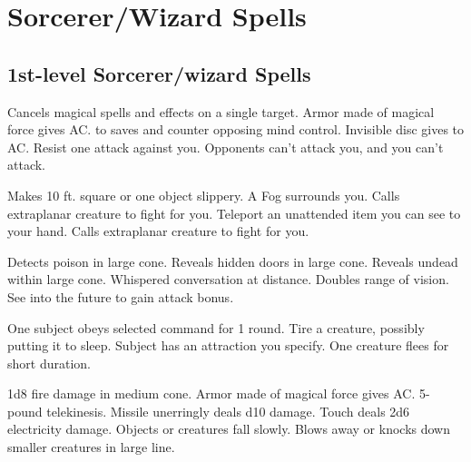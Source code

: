 \section{Sorcerer/Wizard Spells}
\subsection{1st-level Sorcerer/wizard Spells}
\begin{swspelllist}
 Cancels magical spells and effects on a single target.
 Armor made of magical force gives  AC.
  to saves and counter opposing mind control.
 Invisible disc gives  to AC.
 Resist one attack against you.
 Opponents can't attack you, and you can't attack.

 Makes 10 ft. square or one object slippery.
 A Fog surrounds you.
 Calls extraplanar creature to fight for you.
 Teleport an unattended item you can see to your hand.
 Calls extraplanar creature to fight for you.

 Detects poison in large cone.
 Reveals hidden doors in large cone.
 Reveals undead within large cone.
 Whispered conversation at distance.
 Doubles range of vision.
 See into the future to gain attack bonus.

 One subject obeys selected command for 1 round.
 Tire a creature, possibly putting it to sleep.
 Subject has an attraction you specify.
 One creature flees for short duration.

 1d8 fire damage in medium cone.
 Armor made of magical force gives  AC.
 5-pound telekinesis.
 Missile unerringly deals d10 damage.
 Touch deals 2d6 electricity damage.
 Objects or creatures fall slowly.
 Blows away or knocks down smaller creatures in large line.


\end{swspelllist}

